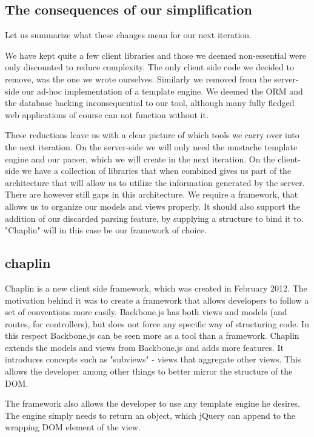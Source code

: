 \documentclass[thesis.tex]{subfiles}
\begin{document}
\subsection{The consequences of our simplification}

Let us summarize what these changes mean for our next iteration.

We have kept quite a few client libraries and those we deemed non-essential were
only discounted to reduce complexity.
The only client side code we decided to remove, was the one we wrote ourselves.
Similarly we removed from the server-side our ad-hoc implementation of a
template engine.
We deemed the ORM and the database backing inconsequential to our tool, although
many fully fledged web applications of course can not function without it.

These reductions leave us with a clear picture of which tools we carry over into
the next iteration.
On the server-side we will only need the mustache template engine
and our parser, which we will create in the next iteration.
On the client-side we have a collection of libraries that when combined gives us
part of the architecture that will allow us to utilize the information generated
by the server.
There are however still gaps in this architecture. We require a framework, that
allows us to organize our models and views properly. It should also support
the addition of our discarded parsing feature, by supplying a structure to bind
it to. "Chaplin" will in this case be our framework of choice.

\subsection{chaplin}
Chaplin is a new client side framework, which was created in February 2012.
The motivation behind it was to create a framework that allows developers to
follow a set of conventions more easily. Backbone.js has both views and models
(and routes, for controllers), but does not force any specific way of
structuring code. In this respect Backbone.js can be seen more as a tool than a
framework.
Chaplin extends the models and views from Backbone.js and adds more features.
It introduces concepts such as "subviews" - views that aggregate other views.
This allows the developer among other things to better mirror the structure of
the DOM.

The framework also allows the developer to use any template engine he desires.
The engine simply needs to return an object, which jQuery can append to the
wrapping DOM element of the view.
\end{document}
